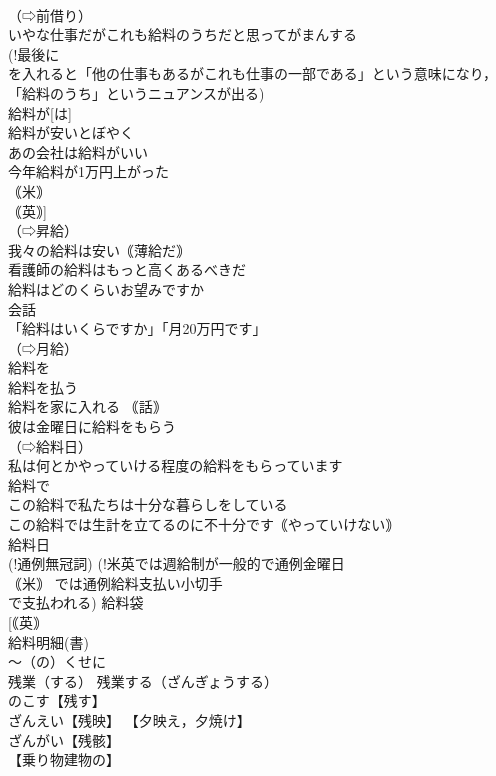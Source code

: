 \documentclass[8pt]{extreport}
\begin{document}
\begin{CJK}{UTF8}{min}
\\	（⇨前借り） 
\\	いやな仕事だがこれも給料のうちだと思ってがまんする 
\\	(!最後に 
\\	を入れると「他の仕事もあるがこれも仕事の一部である」という意味になり，「給料のうち」というニュアンスが出る) 
\\	給料が[は] 
\\	給料が安いとぼやく 
\\	あの会社は給料がいい 
\\	今年給料が1万円上がった 
\\	｟米｠ 
\\	｟英｠] 
\\	（⇨昇給） 
\\	我々の給料は安い｟薄給だ｠ 
\\	看護師の給料はもっと高くあるべきだ 
\\	給料はどのくらいお望みですか 
\\	会話 
\\	「給料はいくらですか」「月20万円です」 
\\	（⇨月給） 
\\	給料を 
\\	給料を払う 
\\	給料を家に入れる ｟話｠
\\	彼は金曜日に給料をもらう 
\\	（⇨給料日） 
\\	私は何とかやっていける程度の給料をもらっています 
\\	給料で 
\\	この給料で私たちは十分な暮らしをしている 
\\	この給料では生計を立てるのに不十分です｟やっていけない｠ 
\\	給料日 
\\	(!通例無冠詞) (!米英では週給制が一般的で通例金曜日
\\	｟米｠ では通例給料支払い小切手 
\\	で支払われる) 給料袋 
\\	[｟英｠ 
\\	給料明細(書) 
\\	〜（の）くせに		
\\	残業（する）		残業する（ざんぎょうする） 
\\	のこす【残す】 
\\	ざんえい【残映】 【夕映え，夕焼け】 
\\	ざんがい【残骸】 
\\	【乗り物建物の】

\end{CJK}
\end{document}
